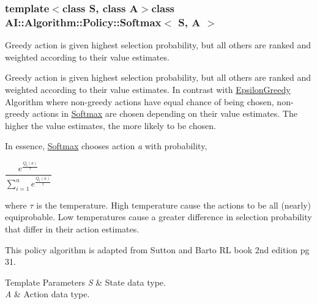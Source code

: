 \subsubsection*{template$<$class S, class A$>$class A\-I\-::\-Algorithm\-::\-Policy\-::\-Softmax$<$ S, A $>$}

Greedy action is given highest selection probability, but all others are ranked and weighted according to their value estimates. 

Greedy action is given highest selection probability, but all others are ranked and weighted according to their value estimates. In contrast with \hyperlink{classAI_1_1Algorithm_1_1Policy_1_1EpsilonGreedy}{Epsilon\-Greedy} Algorithm where non-\/greedy actions have equal chance of being chosen, non-\/greedy actions in \hyperlink{classAI_1_1Algorithm_1_1Policy_1_1Softmax}{Softmax} are chosen depending on their value estimates. The higher the value estimates, the more likely to be chosen.

In essence, \hyperlink{classAI_1_1Algorithm_1_1Policy_1_1Softmax}{Softmax} chooses action {\itshape a} with probability,

$\dfrac{e^{\frac{Q_t(a)}{\tau}}}{\sum_{i=1}^n e^{\frac{Q_t(a)}{\tau}}}$

where $\tau$ is the temperature. High temperature cause the actions to be all (nearly) equiprobable. Low temperatures cause a greater difference in selection probability that differ in their action estimates.

This policy algorithm is adapted from Sutton and Barto R\-L book 2nd edition pg 31.


\begin{DoxyTemplParams}{Template Parameters}
{\em S} & State data type. \\
\hline
{\em A} & Action data type. \\
\hline
\end{DoxyTemplParams}


